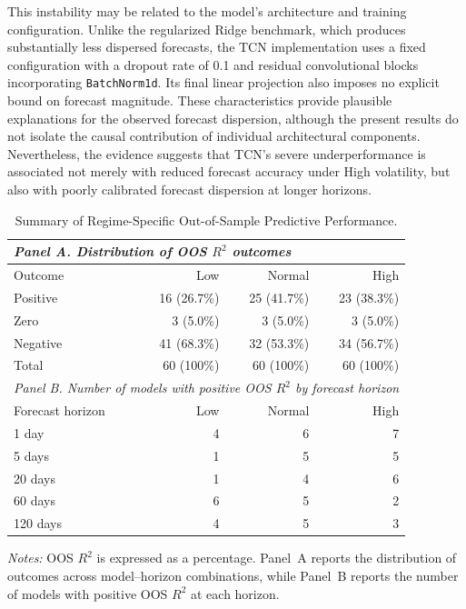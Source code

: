 \documentclass[runningheads,orivec]{llncs}
\begin{document}
This instability may be related to the model's architecture and training configuration. Unlike the regularized Ridge benchmark, which produces substantially less dispersed forecasts, the TCN implementation uses a fixed configuration with a dropout rate of 0.1 and residual convolutional blocks incorporating \texttt{BatchNorm1d}. Its final linear projection also imposes no explicit bound on forecast magnitude. These characteristics provide plausible explanations for the observed forecast dispersion, although the present results do not isolate the causal contribution of individual architectural components. Nevertheless, the evidence suggests that TCN's severe underperformance is associated not merely with reduced forecast accuracy under High volatility, but also with poorly calibrated forecast dispersion at longer horizons.

\begin{table}[htbp]
\centering
\caption{Summary of Regime-Specific Out-of-Sample Predictive Performance.}\label{tab:selected_regime_oos_r2}
\setlength{\tabcolsep}{6pt}
\begin{tabular}{llrrr}
\hline
\multicolumn{5}{l}{\textit{Panel A. Distribution of OOS $R^2$ outcomes}} \\
\hline
\multicolumn{2}{l}{Outcome} & Low & Normal & High \\
\hline
\multicolumn{2}{l}{Positive} & 16 (26.7\%) & 25 (41.7\%) & 23 (38.3\%) \\
\multicolumn{2}{l}{Zero} & 3 (5.0\%) & 3 (5.0\%) & 3 (5.0\%) \\
\multicolumn{2}{l}{Negative} & 41 (68.3\%) & 32 (53.3\%) & 34 (56.7\%) \\
\multicolumn{2}{l}{Total} & 60 (100\%) & 60 (100\%) & 60 (100\%) \\
\hline
\multicolumn{5}{l}{\textit{Panel B. Number of models with positive OOS $R^2$ by forecast horizon}} \\
\hline
\multicolumn{2}{l}{Forecast horizon} & Low & Normal & High \\
\hline
\multicolumn{2}{l}{1 day} & 4 & 6 & 7 \\
\multicolumn{2}{l}{5 days} & 1 & 5 & 5 \\
\multicolumn{2}{l}{20 days} & 1 & 4 & 6 \\
\multicolumn{2}{l}{60 days} & 6 & 5 & 2 \\
\multicolumn{2}{l}{120 days} & 4 & 5 & 3 \\
\hline
\end{tabular}
\par\vspace{4pt}\parbox{\linewidth}{\scriptsize\textit{Notes:} OOS $R^2$ is expressed as a percentage. Panel~A reports the distribution of outcomes across model--horizon combinations, while Panel~B reports the number of models with positive OOS $R^2$ at each horizon.}
\end{table}
\end{document}
